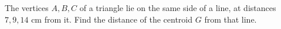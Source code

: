 The vertices $A,B,C$ of a triangle lie on the same side of a line, at distances $7,9,14$ cm from it. Find the distance of the centroid $G$ from that line.
